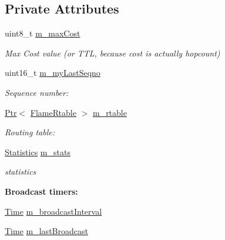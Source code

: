 \subsection*{Private Attributes}
\begin{DoxyCompactItemize}
\item 
uint8\+\_\+t \hyperlink{classns3_1_1flame_1_1FlameProtocol_a858e22014925c21b3773fdf414ff3064}{m\+\_\+max\+Cost}
\begin{DoxyCompactList}\small\item\em Max Cost value (or T\+TL, because cost is actually hopcount) \end{DoxyCompactList}\item 
uint16\+\_\+t \hyperlink{classns3_1_1flame_1_1FlameProtocol_a51d2e538c9c79ad9ab1dff63a957515f}{m\+\_\+my\+Last\+Seqno}
\begin{DoxyCompactList}\small\item\em Sequence number\+: \end{DoxyCompactList}\item 
\hyperlink{classns3_1_1Ptr}{Ptr}$<$ \hyperlink{classns3_1_1flame_1_1FlameRtable}{Flame\+Rtable} $>$ \hyperlink{classns3_1_1flame_1_1FlameProtocol_a6165f21594140afd0df03510fb61eb33}{m\+\_\+rtable}
\begin{DoxyCompactList}\small\item\em Routing table\+: \end{DoxyCompactList}\item 
\hyperlink{structns3_1_1flame_1_1FlameProtocol_1_1Statistics}{Statistics} \hyperlink{classns3_1_1flame_1_1FlameProtocol_a9f33727e9f2483dc9d929a7a82956e0c}{m\+\_\+stats}
\begin{DoxyCompactList}\small\item\em statistics \end{DoxyCompactList}\end{DoxyCompactItemize}
\begin{Indent}{\bf Broadcast timers\+:}\par
\begin{DoxyCompactItemize}
\item 
\hyperlink{classns3_1_1Time}{Time} \hyperlink{classns3_1_1flame_1_1FlameProtocol_a1c150d8b0802a20889fd125b804b24e2}{m\+\_\+broadcast\+Interval}
\item 
\hyperlink{classns3_1_1Time}{Time} \hyperlink{classns3_1_1flame_1_1FlameProtocol_a9ea666e71f74654772318563e939df7f}{m\+\_\+last\+Broadcast}
\end{DoxyCompactItemize}
\end{Indent}
